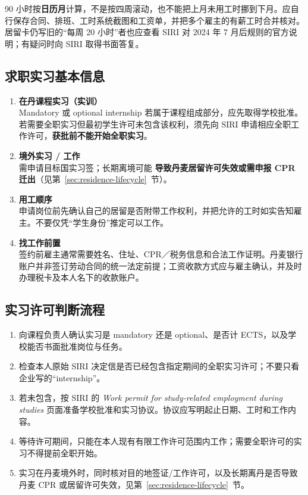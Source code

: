 90 小时按\textbf{日历月}计算，不是按四周滚动，也不能把上月未用工时挪到下月。应自行保存合同、排班、工时系统截图和工资单，并把多个雇主的有薪工时合并核对。居留卡仍写旧的“每周 20 小时”者也应查看 SIRI 对 2024 年 7 月后规则的官方说明；有疑问时向 SIRI 取得书面答复。




\subsection{求职实习基本信息}

\begin{enumerate}[leftmargin=2em,label=\arabic*.]
  \item \textbf{在丹课程实习（实训）}\\
        Mandatory 或 optional internship 若属于课程组成部分，应先取得学校批准。若需要全职实习但最初学生许可未包含该权利，须先向 SIRI 申请相应全职工作许可，\textbf{获批前不能开始全职实习}。
  \item \textbf{境外实习 / 工作}\\
        需申请目标国实习签；长期离境可能 \textbf{导致丹麦居留许可失效或需申报 CPR 迁出}（见第~\ref{sec:residence-lifecycle}~节）。
  \item \textbf{用工顺序}\\
        申请岗位前先确认自己的居留是否附带工作权利，并把允许的工时如实告知雇主。不要仅凭“学生身份”推定可以工作。
  \item \textbf{找工作前置}\\
        签约前雇主通常需要姓名、住址、CPR／税务信息和合法工作证明。丹麦银行账户并非签订劳动合同的统一法定前提；工资收款方式应与雇主确认，并及时办理税卡及本人名下的收款账户。
\end{enumerate}

\subsection{实习许可判断流程}

\begin{enumerate}[leftmargin=2.2em,itemsep=3pt]
  \item 向课程负责人确认实习是 mandatory 还是 optional、是否计 ECTS，以及学校能否书面批准岗位与任务。
  \item 检查本人原始 SIRI 决定信是否已经包含指定期间的全职实习许可；不要只看企业写的“internship”。
  \item 若未包含，按 SIRI 的 \emph{Work permit for study-related employment during studies} 页面准备学校批准和实习协议。协议应写明起止日期、工时和工作内容。
  \item 等待许可期间，只能在本人现有有限工作许可范围内工作；需要全职许可的实习不得提前全职开始。
  \item 实习在丹麦境外时，同时核对目的地签证/工作许可，以及长期离丹是否导致丹麦 CPR 或居留许可失效，见第~\ref{sec:residence-lifecycle}~节。
\end{enumerate}

